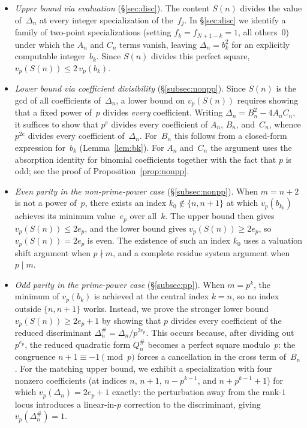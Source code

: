 \documentclass[10pt]{amsart}
\theoremstyle{definition}
\theoremstyle{remark}
\begin{document}
\begin{itemize}
\item \emph{Upper bound via evaluation}
  \textup{(\S\ref{sec:disc}).}\enspace
  The content $S(n)$ divides the value of~$\Delta_n$ at every integer
  specialization of the~$f_j$.  In \S\ref{sec:disc} we identify a
  family of two-point specializations (setting $f_k = f_{N+1-k} = 1$,
  all others~$0$) under which the $A_n$ and $C_n$ terms vanish,
  leaving $\Delta_n = b_k^2$ for an explicitly computable
  integer~$b_k$.  Since $S(n)$ divides this perfect square,
  $v_p(S(n)) \le 2\,v_p(b_k)$.

\item \emph{Lower bound via coefficient divisibility}
  \textup{(\S\ref{subsec:nonpp}).}\enspace
  Since $S(n)$ is the gcd of all coefficients of~$\Delta_n$,
  a lower bound on $v_p(S(n))$ requires showing that a fixed power
  of~$p$ divides \emph{every} coefficient.  Writing
  $\Delta_n = B_n^2 - 4A_nC_n$, it suffices to show that $p^e$
  divides every coefficient of $A_n$, $B_n$, and~$C_n$, whence
  $p^{2e}$ divides every coefficient of~$\Delta_n$.  For~$B_n$ this
  follows from a closed-form expression for~$b_k$
  (Lemma~\ref{lem:bk}).  For $A_n$ and~$C_n$ the argument uses the
  absorption identity for binomial coefficients together with the
  fact that $p$ is odd; see the proof of
  Proposition~\ref{prop:nonpp}.

\item \emph{Even parity in the non-prime-power case}
  \textup{(\S\ref{subsec:nonpp}).}\enspace
  When $m = n+2$ is not a power of~$p$, there exists an index
  $k_0 \notin \{n,n+1\}$ at which $v_p(b_{k_0})$ achieves its
  minimum value~$e_p$ over all~$k$.  The upper bound then gives
  $v_p(S(n)) \le 2e_p$, and the lower bound gives
  $v_p(S(n)) \ge 2e_p$, so $v_p(S(n)) = 2e_p$ is even.
  The existence of such an index $k_0$ uses a valuation shift
  argument when $p \nmid m$, and a complete residue system
  argument when $p \mid m$.

\item \emph{Odd parity in the prime-power case}
  \textup{(\S\ref{subsec:pp}).}\enspace
  When $m = p^k$, the minimum of $v_p(b_k)$ is achieved at the
  central index $k = n$, so no index outside $\{n,n+1\}$ works.
  Instead, we prove the stronger lower bound
  $v_p(S(n)) \ge 2e_p + 1$ by showing that $p$ divides every
  coefficient of the reduced discriminant
  $\Delta_n^{\#} = \Delta_n / p^{2e_p}$.  This occurs because,
  after dividing out $p^{e_p}$, the reduced quadratic form
  $Q_n^{\#}$ becomes a perfect square modulo~$p$: the congruence
  $n+1 \equiv -1 \pmod{p}$ forces a cancellation in the cross
  term of~$B_n$.  For the matching upper bound, we exhibit a specialization
  with four nonzero coefficients (at indices $n$, $n+1$,
  $n - p^{k-1}$, and $n + p^{k-1} + 1$) for which
  $v_p(\Delta_n) = 2e_p + 1$ exactly: the perturbation away from
  the rank-$1$ locus introduces a linear-in-$p$ correction to the
  discriminant, giving $v_p(\Delta_n^{\#}) = 1$.


\end{itemize}
\end{document}

